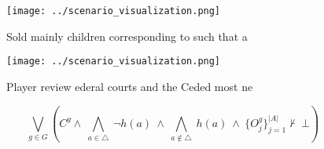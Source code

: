 \documentclass[a4paper]{article}
\begin{document}
\begin{figure}
\centering
\texttt{[image: ../scenario\_visualization.png]}
\caption{Sold mainly children corresponding to such that a
}
\end{figure}
 
\begin{figure}
\centering
\texttt{[image: ../scenario\_visualization.png]}
\caption{Player review ederal courts and the Ceded most ne
}
\end{figure}
 
\[\bigvee_{g\in G} (C^g \wedge\ \bigwedge_{a\in \triangle}\ \neg h(a)\ \wedge\ \bigwedge_{a\notin \triangle}\ h(a)\ \wedge\ \{O_j^g\}_{j=1}^{|A|} \nvdash\ \bot )\]
\end{document}
